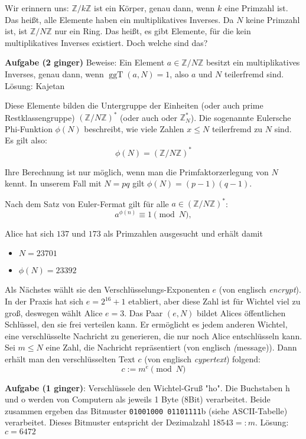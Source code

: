 \documentclass{article}
\newcommand{\ggT}{\operatorname{ggT}}
\newcommand{\Z}{\mathbb{Z}}
\begin{document}
Wir erinnern uns: $\Z/{k\Z}$ ist ein Körper, genau dann, wenn $k$ eine Primzahl ist. Das heißt, alle Elemente haben ein multiplikatives Inverses. Da $N$ keine Primzahl ist, ist $\Z/{N\Z}$ nur ein Ring. Das heißt, es gibt Elemente, für die kein multiplikatives Inverses existiert. Doch welche sind das?

\textbf{Aufgabe (2 ginger)} Beweise: Ein Element $a \in \Z/{N\Z}$ besitzt ein multiplikatives Inverses, genau dann, wenn $\ggT(a, N) = 1$, also $a$ und $N$ teilerfremd sind.
Lösung: Kajetan

Diese Elemente bilden die Untergruppe der Einheiten (oder auch \glqq prime Restklassengruppe\grqq) $(\Z/{N\Z})^*$ (oder auch oder $\Z_N^*$). Die sogenannte Eulersche Phi-Funktion $\phi(N)$ beschreibt, wie viele Zahlen $x \leq N$ teilerfremd zu $N$ sind. Es gilt also:
$$\phi(N) = (\Z/{N\Z})^*$$

Ihre Berechnung ist nur möglich, wenn man die Primfaktorzerlegung von $N$ kennt. In unserem Fall mit $N = pq$ gilt $\phi(N) = (p-1)(q-1)$.

Nach dem Satz von Euler-Fermat gilt für alle $a \in (\Z/{N\Z})^*$:
$$a^{\phi(n)} \equiv 1 \pmod N,$$

Alice hat sich $137$ und $173$ als Primzahlen ausgesucht und erhält damit
\begin{itemize}
    \item $N = 23701$
    \item $\phi(N) = 23392$
\end{itemize}

Als Nächstes wählt sie den Verschlüsselungs-Exponenten $e$ (von englisch \emph{encrypt}). In der Praxis hat sich $e = 2^{16}+1$ etabliert, aber diese Zahl ist für Wichtel viel zu groß, deswegen wählt Alice $e = 3$. Das Paar $(e, N)$ bildet Alices öffentlichen Schlüssel, den sie frei verteilen kann. Er ermöglicht es jedem anderen Wichtel, eine verschlüsselte Nachricht zu generieren, die nur noch Alice entschlüsseln kann. Sei $m \leq N$ eine Zahl, die Nachricht repräsentiert (von englisch \emph(message)). Dann erhält man den verschlüsselten Text $c$ (von englisch \emph{cypertext}) folgend:
$$ c := m^e \pmod N $$

\textbf{Aufgabe (1 ginger)}: Verschlüssele den Wichtel-Gruß "ho". Die Buchstaben h und o werden von Computern als jeweils 1 Byte (8Bit) verarbeitet. Beide zusammen ergeben das Bitmuster \texttt{01001000 01101111}b (siehe ASCII-Tabelle) verarbeitet. Dieses Bitmuster entspricht der Dezimalzahl $18543 =: m$.
Lösung: $c = 6472$
\end{document}
